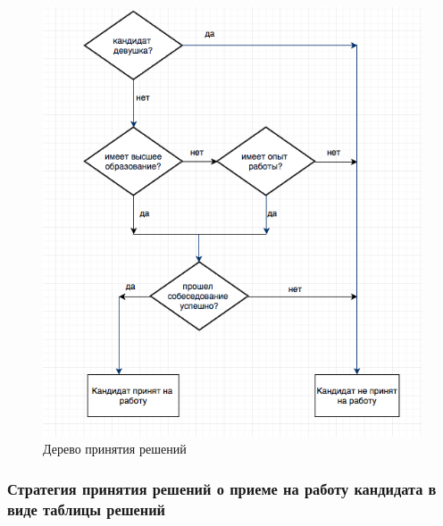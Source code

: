 \documentclass[14pt,a4paper,report]{report}
\begin{document}
\begin{figure}[h!]
\centering
\includegraphics[scale = 0.70]{images/tree.jpg}
\caption{Дерево принятия решений}
\label{image:2}
\end{figure}

\clearpage

\subsubsection{Стратегия принятия решений о приеме на работу кандидата в виде таблицы решений}
\end{document}
